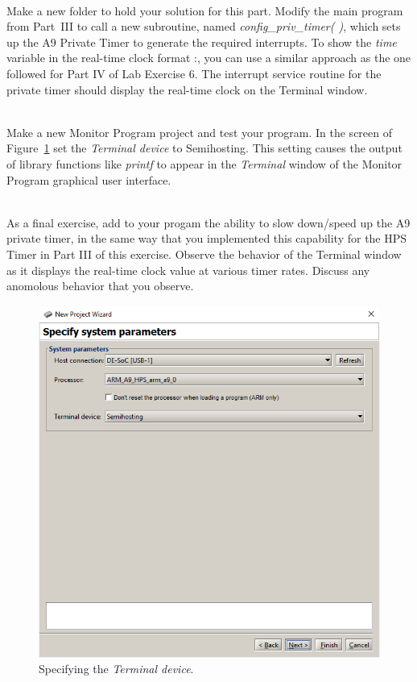\documentclass[epsfig,10pt,fullpage]{article}
\newcommand{\CommonDocsPath}{../../../../common/docs}
\begin{document}
~\\
\noindent
Make a new folder to hold your solution for this part. Modify the main
program from Part~III to call a new subroutine, named {\it config\_priv\_timer( )}, which 
sets up the
A9 Private Timer to generate the required interrupts. To show the {\it time} variable in
the real-time clock format :, you can use a similar approach as the one
followed for Part IV of Lab Exercise 6.  The interrupt service routine for
the private timer should display the real-time clock on the Terminal window.

~\\
\noindent
Make a new Monitor Program project and test your program. In the screen of 
Figure~\ref{fig:MPterminal} set the {\it Terminal device} to {\sf Semihosting}.
This setting causes the output of library functions like {\it printf} to appear 
in the {\it Terminal} window of the Monitor Program graphical user interface.

~\\
\noindent
As a final exercise, add to your progam the ability to slow down/speed up the A9 private 
timer, in the same way that you implemented this capability for the HPS Timer in Part III
of this exercise. Observe the behavior of the Terminal window as it displays the real-time 
clock value at various timer rates.  Discuss any anomolous behavior that you observe.

\newpage
\begin{figure}[htb]
	\begin{center}
	\includegraphics[scale=0.58]{figures/figureMP_terminal.png}
	\end{center}
	\vspace{-0.25cm}\caption{Specifying the {\it Terminal device}.}
\label{fig:MPterminal}
\end{figure}



\end{document}

